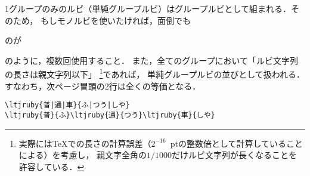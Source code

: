 \documentclass[a4paper,10ptj]{ltjsarticle}
\begin{document}
1グループのみのルビ（単純グループルビ）はグループルビとして組まれる．そのため，
もしモノルビを使いたければ，面倒でも
\begin{LTXexample}[width=0.4\textwidth, preset=\Large]
のが
\end{LTXexample}
のように，複数回使用すること．
また，全てのグループにおいて「ルビ文字列の長さは親文字列以下」
\footnote{%
  実際には\TeX での長さの計算誤差（$2^{-16}$~ptの整数倍として計算していることによる）を考慮し，
  親文字全角の$1/1000$だけルビ文字列が長くなることを許容している．
}であれば，
単純グループルビの並びとして扱われる．すなわち，次ページ冒頭の2行は全くの等価となる．
\begin{verbatim}
\ltjruby{普|通|車}{ふ|つう|しや}
\ltjruby{普}{ふ}\ltjruby{通}{つう}\ltjruby{車}{しや}
\end{verbatim}
\end{document}
